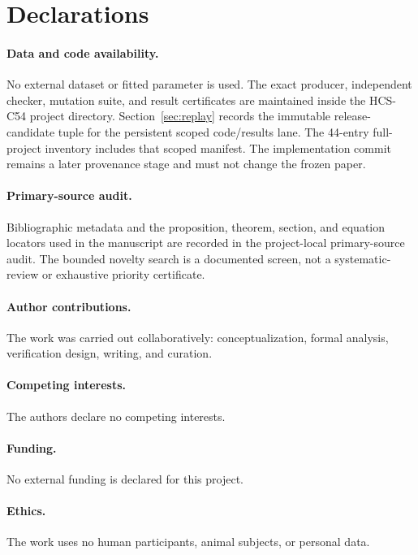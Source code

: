 \section{Declarations}
\label{sec:declarations}

\paragraph{Data and code availability.}
No external dataset or fitted parameter is used.  The exact producer,
independent checker, mutation suite, and result certificates are maintained
inside the HCS-C54 project directory.  Section~\ref{sec:replay} records the
immutable release-candidate tuple for the persistent scoped code/results lane.
The 44-entry full-project inventory includes that scoped manifest.  The
implementation commit remains a later provenance stage and must not change the
frozen paper.

\paragraph{Primary-source audit.}
Bibliographic metadata and the proposition, theorem, section, and equation
locators used in the manuscript are recorded in the project-local
primary-source audit.  The bounded novelty search is a documented screen,
not a systematic-review or exhaustive priority certificate.

\paragraph{Author contributions.}
The work was carried out collaboratively: conceptualization, formal analysis,
verification design, writing, and curation.

\paragraph{Competing interests.}
The authors declare no competing interests.

\paragraph{Funding.}
No external funding is declared for this project.

\paragraph{Ethics.}
The work uses no human participants, animal subjects, or personal data.

